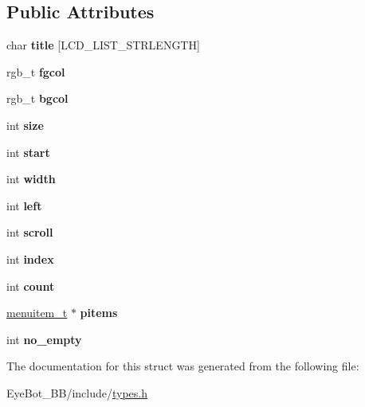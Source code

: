 \subsection*{\-Public \-Attributes}
\begin{DoxyCompactItemize}
\item 
\hypertarget{structlistmenu__t_a5d9eea59374d1f643550997b9142618f}{char {\bfseries title} \mbox{[}\-L\-C\-D\-\_\-\-L\-I\-S\-T\-\_\-\-S\-T\-R\-L\-E\-N\-G\-T\-H\mbox{]}}\label{structlistmenu__t_a5d9eea59374d1f643550997b9142618f}

\item 
\hypertarget{structlistmenu__t_a5545bcd3dcec4b3948373a126c61ae8b}{rgb\-\_\-t {\bfseries fgcol}}\label{structlistmenu__t_a5545bcd3dcec4b3948373a126c61ae8b}

\item 
\hypertarget{structlistmenu__t_a078d8a9604d35d73ef0ef396b75e9362}{rgb\-\_\-t {\bfseries bgcol}}\label{structlistmenu__t_a078d8a9604d35d73ef0ef396b75e9362}

\item 
\hypertarget{structlistmenu__t_a6a60541aa3417d57bca8d233cf604c62}{int {\bfseries size}}\label{structlistmenu__t_a6a60541aa3417d57bca8d233cf604c62}

\item 
\hypertarget{structlistmenu__t_a5c7df13da5320ad086c4d8d5b14edf90}{int {\bfseries start}}\label{structlistmenu__t_a5c7df13da5320ad086c4d8d5b14edf90}

\item 
\hypertarget{structlistmenu__t_a6dec1bc5ab6aeb8959e711408ca30609}{int {\bfseries width}}\label{structlistmenu__t_a6dec1bc5ab6aeb8959e711408ca30609}

\item 
\hypertarget{structlistmenu__t_a7c61542e663cfb9b2291998ec7aca698}{int {\bfseries left}}\label{structlistmenu__t_a7c61542e663cfb9b2291998ec7aca698}

\item 
\hypertarget{structlistmenu__t_a79f78d576f3e0242da42d6a2034cb032}{int {\bfseries scroll}}\label{structlistmenu__t_a79f78d576f3e0242da42d6a2034cb032}

\item 
\hypertarget{structlistmenu__t_a15a7ed1476d2e63dd165ce7b27b1b3f8}{int {\bfseries index}}\label{structlistmenu__t_a15a7ed1476d2e63dd165ce7b27b1b3f8}

\item 
\hypertarget{structlistmenu__t_ade3a565f5e99dcfcd6359adb03b086c1}{int {\bfseries count}}\label{structlistmenu__t_ade3a565f5e99dcfcd6359adb03b086c1}

\item 
\hypertarget{structlistmenu__t_a24274a2a33305480890e5e27152c602f}{\hyperlink{structmenuitem__t}{menuitem\-\_\-t} $\ast$ {\bfseries pitems}}\label{structlistmenu__t_a24274a2a33305480890e5e27152c602f}

\item 
\hypertarget{structlistmenu__t_aaf2a3f64ebb261a62cc78e9943143c97}{int {\bfseries no\-\_\-empty}}\label{structlistmenu__t_aaf2a3f64ebb261a62cc78e9943143c97}

\end{DoxyCompactItemize}


\-The documentation for this struct was generated from the following file\-:\begin{DoxyCompactItemize}
\item 
\-Eye\-Bot\-\_\-\-B\-B/include/\hyperlink{types_8h}{types.\-h}\end{DoxyCompactItemize}
